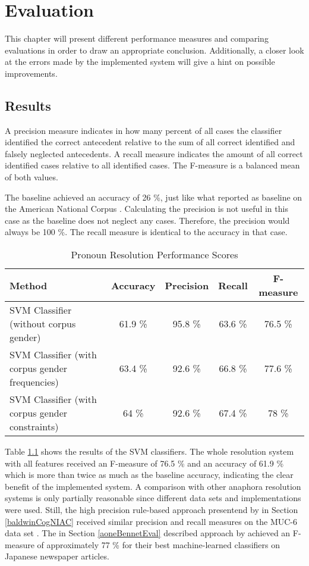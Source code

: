 \chapter{Evaluation}
\label{sec:Evaluation}

This chapter will present different performance measures and comparing evaluations in order to draw an appropriate conclusion. Additionally, a closer look at the errors made by the implemented system will give a hint on possible improvements.

\section{Results}
A precision measure indicates in how many percent of all cases the classifier identified the correct antecedent relative to the sum of all correct identified and falsely neglected antecedents. A recall measure indicates the amount of all correct identified cases relative to all identified cases. The F-measure is a balanced mean of both values.

The baseline achieved an accuracy of 26 \%, just like what \cite{bergsma2005automatic} reported as baseline on the American National Corpus \citep{ide2001american}. Calculating the precision is not useful in this case as the baseline does not neglect any cases. Therefore, the precision would always be 100 \%. The recall measure is identical to the accuracy in that case.

\begin{table}[h]
\centering
\begin{tabular}{|l|c|c|c|c|}
	\hline
	Method & Accuracy & Precision & Recall & F-measure \\ \hline
	\hline
	SVM Classifier (without corpus gender) & 61.9 \% & 95.8 \% & 63.6 \% & 76.5 \% \\ \hline
	SVM Classifier (with corpus gender frequencies) & 63.4 \%  & 92.6 \% & 66.8 \% & 77.6 \% \\ \hline
	SVM Classifier (with corpus gender constraints) & 64 \%  & 92.6 \% & 67.4 \% & 78 \% \\ \hline
	\end{tabular}
  \caption{Pronoun Resolution Performance Scores}
     \label{table:pronounResScores}
\end{table}


Table \ref{table:pronounResScores} shows the results of the SVM classifiers. The whole resolution system with all features received an F-measure of 76.5 \% and an accuracy of 61.9 \% which is more than twice as much as the baseline accuracy, indicating the clear benefit of the implemented system. A comparison with other anaphora resolution systems is only partially reasonable since different data sets and implementations were used. Still, the high precision rule-based approach presentend by \cite{baldwin1997cogniac} in Section \ref{baldwinCogNIAC} received similar precision and recall measures on the MUC-6 data set \citep{grishman1996message}. The in Section \ref{aoneBennetEval} described approach by \cite{aone1995evaluating} achieved an F-measure of approximately 77 \% for their best machine-learned classifiers on Japanese newspaper articles.

